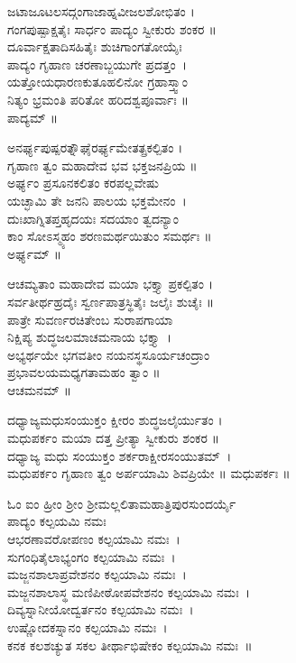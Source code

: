 ಜಟಾಜೂಟಲಸದ್ಗಂಗಾಜಾಹ್ನವೀಜಲಶೋಭಿತಂ ।\\
ಗಂಗಪುಷ್ಪಾಕ್ಷತೈಃ ಸಾರ್ಧಂ ಪಾದ್ಯಂ ಸ್ವೀಕುರು ಶಂಕರ ॥\\
ದೂರ್ವಾಕ್ಷತಾದಿಸಹಿತೈಃ ಶುಚಿಗಾಂಗತೋಯೈಃ\\ ಪಾದ್ಯಂ ಗೃಹಾಣ ಚರಣಾಬ್ಜಯುಗೇ ಪ್ರದತ್ತಂ~।\\
ಯತ್ತೋಯಧಾರಣಕುತೂಹಲಿನೋ ಗ್ರಹಾಸ್ತ್ವಾಂ \\ನಿತ್ಯಂ ಭ್ರಮಂತಿ ಪರಿತೋ ಹರಿದಶ್ವಪೂರ್ವಾಃ ॥\\
ಪಾದ್ಯಮ್ ॥

ಅನರ್ಘ್ಯಪುಷ್ಪರತ್ನೌಘೈರರ್ಘ್ಯಮೇತತ್ಪ್ರಕಲ್ಪಿತಂ ।\\
ಗೃಹಾಣ ತ್ವಂ ಮಹಾದೇವ ಭವ ಭಕ್ತಜನಪ್ರಿಯ ॥\\
ಅರ್ಘ್ಯಂ ಪ್ರಸೂನಕಲಿತಂ ಕರಪಲ್ಲವೇಷು \\ಯಚ್ಛಾಮಿ ತೇ ಜನನಿ ಪಾಲಯ ಭಕ್ತಮೇನಂ~।\\
ದುಃಖಾಗ್ನಿತಪ್ತಹೃದಯಃ ಸದಯಾಂ ತ್ವದನ್ಯಾಂ\\ ಕಾಂ ಸೋಽಸ್ಮ್ಯಹಂ ಶರಣಮರ್ಥಯಿತುಂ ಸಮರ್ಥಃ ॥\\
 ಅರ್ಘ್ಯಮ್ ॥

ಆಚಮ್ಯತಾಂ ಮಹಾದೇವ ಮಯಾ ಭಕ್ತ್ಯಾ ಪ್ರಕಲ್ಪಿತಂ ।\\
ಸರ್ವತೀರ್ಥಹ್ರದೈಃ ಸ್ವರ್ಣಪಾತ್ರಸ್ಥಿತೈಃ ಜಲೈಃ ಶುಚೈಃ ॥ \\
ಪಾತ್ರೇ ಸುವರ್ಣರಚಿತೇಂಬ ಸುರಾಪಗಾಯಾ \\ನಿಕ್ಷಿಪ್ಯ ಶುದ್ಧಜಲಮಾಚಮನಾಯ ಭಕ್ತ್ಯಾ~।\\
ಅಭ್ಯರ್ಥಯೇ ಭಗವತೀಂ ನಯನಸ್ಥಸೂರ್ಯಚಂದ್ರಾಂ\\ ಪ್ರಭಾವಲಯಮಧ್ಯಗತಾಮಹಂ ತ್ವಾಂ ॥\\
 ಆಚಮನಮ್ ॥

ದಧ್ಯಾಜ್ಯಮಧುಸಂಯುಕ್ತಂ ಕ್ಷೀರಂ ಶುದ್ಧಜಲೈರ್ಯುತಂ ।\\
ಮಧುಪರ್ಕಂ ಮಯಾ ದತ್ತ ಪ್ರೀತ್ಯಾ ಸ್ವೀಕುರು ಶಂಕರ ॥\\
ದಧ್ಯಾಜ್ಯ ಮಧು ಸಂಯುಕ್ತಂ ಶರ್ಕರಾಕ್ಷೀರಸಂಯುತಮ್~।\\ಮಧುಪರ್ಕಂ ಗೃಹಾಣ ತ್ವಂ ಅರ್ಪಯಾಮಿ ಶಿವಪ್ರಿಯೇ ॥
 ಮಧುಪರ್ಕಃ ॥

ಓಂ ಐಂ ಹ್ರೀಂ ಶ್ರೀಂ ಶ್ರೀಮಲ್ಲಲಿತಾಮಹಾತ್ರಿಪುರಸುಂದರ್ಯೈ\\ ಪಾದ್ಯಂ ಕಲ್ಪಯಮಿ ನಮಃ\\
ಆಭರಣಾವರೋಪಣಂ ಕಲ್ಪಯಾಮಿ ನಮಃ~।\\
ಸುಗಂಧಿತೈಲಾಭ್ಯಂಗಂ ಕಲ್ಪಯಾಮಿ ನಮಃ~।\\
ಮಜ್ಜನಶಾಲಾಪ್ರವೇಶನಂ ಕಲ್ಪಯಾಮಿ ನಮಃ~।\\
ಮಜ್ಜನಶಾಲಾಸ್ಥ ಮಣಿಪೀಠೋಪವೇಶನಂ ಕಲ್ಪಯಾಮಿ ನಮಃ~।\\
ದಿವ್ಯಸ್ನಾನೀಯೋದ್ವರ್ತನಂ ಕಲ್ಪಯಾಮಿ ನಮಃ~।\\
ಉಷ್ಣೋದಕಸ್ನಾನಂ ಕಲ್ಪಯಾಮಿ ನಮಃ~।\\
ಕನಕ ಕಲಶಚ್ಯುತ ಸಕಲ ತೀರ್ಥಾಭಿಷೇಕಂ ಕಲ್ಪಯಾಮಿ ನಮಃ~॥

